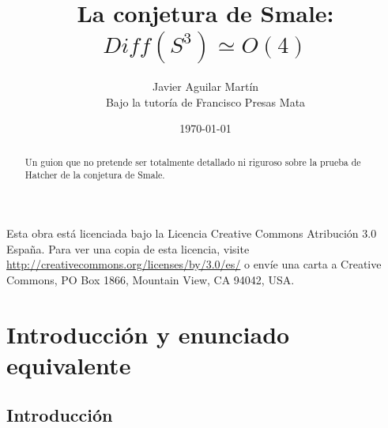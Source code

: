 \documentclass[twoside, 11pt]{article}
\begin{document}

\author{Javier Aguilar Martín\\ Bajo la tutoría de Francisco Presas Mata}

\date{\today}
\title{La conjetura de Smale:\\ $Diff(S^3)\simeq O(4)$}

\maketitle


\begin{abstract}
Un guion que no pretende ser totalmente detallado ni riguroso sobre la prueba de Hatcher de la conjetura de Smale. 
\end{abstract}


	\vfill
	Esta obra está licenciada bajo la Licencia Creative Commons Atribución 3.0 España. Para ver una copia de esta licencia, visite \url{http://creativecommons.org/licenses/by/3.0/es/} o envíe una carta a Creative Commons, PO Box 1866, Mountain View, CA 94042, USA.


\newpage
\tableofcontents

\newpage

\section{Introducción y enunciado equivalente}
\subsection{Introducción}
\end{document}
